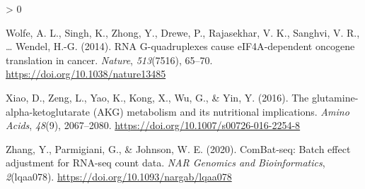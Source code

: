 \documentclass[
  12pt,
  openany]{book}
\newlength{\cslhangindent}
\newenvironment{CSLReferences}[2] %
 {%
  \setlength{\parindent}{0pt}
  \ifodd #1 \everypar{\setlength{\hangindent}{\cslhangindent}}\ignorespaces\fi
  \ifnum #2 > 0
  \setlength{\parskip}{#2\baselineskip}
  \fi
 }%
 {}
\begin{document}
\begin{CSLReferences}{1}{0}
\leavevmode\hypertarget{ref-Wolfe2014}{}%
Wolfe, A. L., Singh, K., Zhong, Y., Drewe, P., Rajasekhar, V. K., Sanghvi, V. R., \ldots{} Wendel, H.-G. (2014). {RNA G}-quadruplexes cause {eIF4A}-dependent oncogene translation in cancer. \emph{Nature}, \emph{513}(7516), 65--70. \url{https://doi.org/10.1038/nature13485}

\leavevmode\hypertarget{ref-Xiao2016a}{}%
Xiao, D., Zeng, L., Yao, K., Kong, X., Wu, G., \& Yin, Y. (2016). The glutamine-alpha-ketoglutarate ({AKG}) metabolism and its nutritional implications. \emph{Amino Acids}, \emph{48}(9), 2067--2080. \url{https://doi.org/10.1007/s00726-016-2254-8}

\leavevmode\hypertarget{ref-Zhang2020}{}%
Zhang, Y., Parmigiani, G., \& Johnson, W. E. (2020). {ComBat}-seq: Batch effect adjustment for {RNA}-seq count data. \emph{NAR Genomics and Bioinformatics}, \emph{2}(lqaa078). \url{https://doi.org/10.1093/nargab/lqaa078}

\end{CSLReferences}
\end{document}
